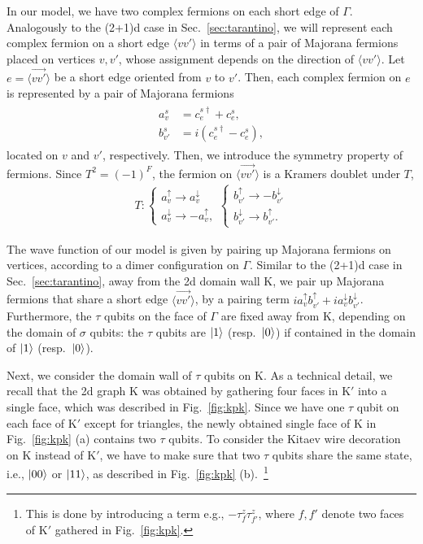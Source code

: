 \documentclass[12pt]{article}
\numberwithin{equation}{section}
\begin{document}
In our model, we have two complex fermions on each short edge of $\Gamma$. Analogously to the (2+1)d case in Sec.~\ref{sec:tarantino}, we will represent each complex fermion on a short edge $\langle vv'\rangle$ in terms of a pair of Majorana fermions placed on vertices $v, v'$, whose assignment depends on the direction of $\langle vv'\rangle$.
Let $e = \langle \overrightarrow{vv'}\rangle$ be a short edge oriented from $v$ to $v'$. Then, each complex fermion on $e$ is represented by a pair of Majorana fermions
\begin{align}
    \begin{split}
        a_{v}^{s} &= c_{e}^{s\dagger}+c_{e}^{s}, \\
        b_{v'}^{s} &= i(c_{e}^{s\dagger}-c_{e}^{s}),
    \end{split}
    \label{eq:3dmajorana}
\end{align}
located on $v$ and $v'$, respectively. Then, we introduce the symmetry property of fermions.
Since $T^2=(-1)^F$, the fermion on $\langle \overrightarrow{vv'}\rangle$ is a Kramers doublet under $T$,
\begin{align}
T:
\begin{cases}
a_v^{\uparrow}\to a_v^{\downarrow}\\
a_v^{\downarrow}\to-a_v^{\uparrow},
\end{cases}
\begin{cases}
b_{v'}^{\uparrow}\to-b_{v'}^{\downarrow}\\
b_{v'}^{\downarrow}\to b_{v'}^{\uparrow}.
\end{cases}
\label{eq:tfermion}
\end{align}

The wave function of our model is given by pairing up Majorana fermions on vertices, according to a dimer configuration on $\Gamma$.  
Similar to the (2+1)d case in Sec.~\ref{sec:tarantino}, away from the 2d domain wall $\mathrm{K}$, we pair up Majorana fermions that share a short edge $\langle \overrightarrow{vv'}\rangle$, by a pairing term $ia_v^{\uparrow}b_{v'}^{\uparrow}+ia_v^{\downarrow}b_{v'}^{\downarrow}$.
Furthermore, the $\tau$ qubits on the face of $\Gamma$ are fixed away from $\mathrm{K}$, depending on the domain of $\sigma$ qubits: the $\tau$ qubits are $\ket{1}$ (resp.~$\ket{0}$) if contained in the domain of $\ket{1}$ (resp.~$\ket{0}$).

Next, we consider the domain wall of $\tau$ qubits on $\mathrm{K}$. 
As a technical detail, we recall that the 2d graph $\mathrm{K}$ was obtained by gathering four faces in $\mathrm{K}'$ into a single face, which was described in Fig.~\ref{fig:kpk}. 
Since we have one $\tau$ qubit on each face of $\mathrm{K}'$ except for triangles, the newly obtained single face of $\mathrm{K}$ in Fig.~\ref{fig:kpk} (a) contains two $\tau$ qubits. 
To consider the Kitaev wire decoration on $\mathrm{K}$ instead of $\mathrm{K}'$, we have to make sure that two $\tau$ qubits share the same state, i.e., $\ket{00}$ or $\ket{11}$, as described in Fig.~\ref{fig:kpk} (b).~\footnote{
This is done by introducing a term e.g., $-\tau^z_f\tau^z_{f'}$, where $f, f'$ denote two faces of $\mathrm{K}'$ gathered in Fig.~\ref{fig:kpk}.} 
\end{document}
